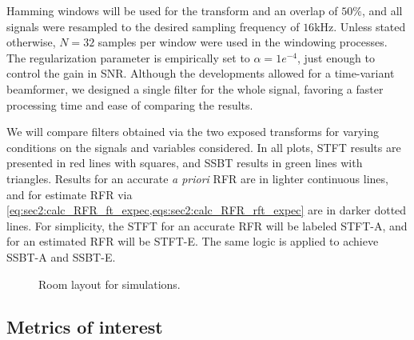 Hamming windows will be used for the transform and an overlap of $50\%$, and all signals were resampled to the desired sampling frequency of $16\si{\kilo\hertz}$. Unless stated otherwise, $N = 32$ samples per window were used in the windowing processes. The regularization parameter is empirically set to $\alpha = 1e^{-4}$, just enough to control the gain in SNR. Although the developments allowed for a time-variant beamformer, we designed a single filter for the whole signal, favoring a faster processing time and ease of comparing the results.

We will compare filters obtained via the two exposed transforms for varying conditions on the signals and variables considered. In all plots, STFT results are presented in red lines with squares, and SSBT results in green lines with triangles. Results for an accurate \textit{a priori} RFR are in lighter continuous lines, and for estimate RFR via \cref{eq:sec2:calc_RFR_ft_expec,eqs:sec2:calc_RFR_rft_expec} are in darker dotted lines. For simplicity, the STFT for an accurate RFR will be labeled STFT-A, and for an estimated RFR will be STFT-E. The same logic is applied to achieve SSBT-A and SSBT-E.

\begin{figure}[!t]
	\centering
	
	\caption{Room layout for simulations.}
	\label{fig:room_layout}
\end{figure}
%

\subsection{Metrics of interest}

